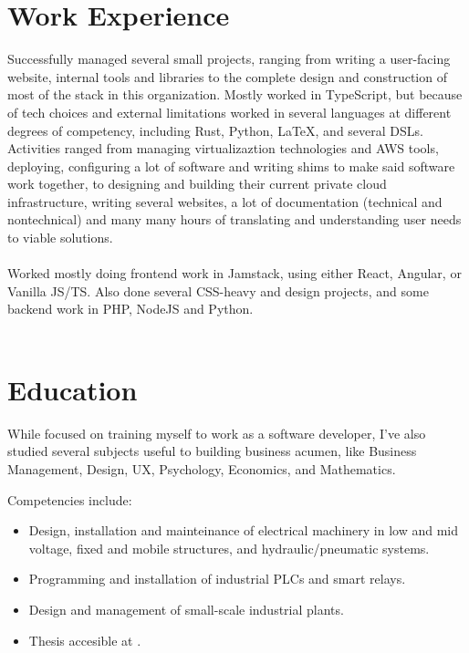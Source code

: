 \documentclass[11pt,a4paper,sans]{moderncv}
\begin{document}
\section{Work Experience}
{
{\flushleft Successfully managed several small projects, ranging from writing a user-facing website, internal tools and libraries to the complete design and construction of most of the stack in this organization. Mostly worked in TypeScript, but because of tech choices and external limitations worked in several languages at different degrees of competency, including Rust, Python, LaTeX, and several DSLs. Activities ranged from managing virtualizaztion technologies and AWS tools, deploying, configuring a lot of software and writing shims to make said software work together, to designing and building their current private cloud infrastructure, writing several websites, a lot of documentation (technical and nontechnical) and many many hours of translating and understanding user needs to viable solutions.   } \hfill \\[-1em]
\hfill \\[1em]

{\flushleft Worked mostly doing frontend work in Jamstack, using either React, Angular, or Vanilla JS/TS. Also done several CSS-heavy and design projects, and some backend work in PHP, NodeJS and Python.} \hfill \\[-1em]
\hfill \\




\section{Education}
{\flushleft While focused on training myself to work as a software developer, I've also studied several subjects useful to building business acumen, like Business Management, Design, UX, Psychology, Economics, and Mathematics.}
\hfill \\[1em]

{\flushleft Competencies include: \begin{itemize}
		\item Design, installation and mainteinance of electrical machinery in low and mid voltage, fixed and mobile structures, and hydraulic/pneumatic systems.
		\item Programming and installation of industrial PLCs and smart relays.
		\item Design and management of small-scale industrial plants.
		\item Thesis accesible at \href{https://goo.gl/JtjfTV}{\color{blue}{goo.gl/JtjfTV}}.
	\end{itemize}
	\hfill \\[2em]
}

}
\end{document}
